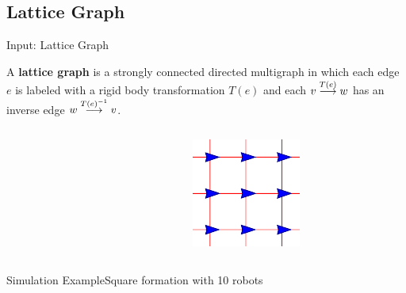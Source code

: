 \subsection{Lattice Graph}
\begin{frame}{Input: Lattice Graph}
  \begin{definition}
    A \textbf{lattice graph} is a strongly connected directed
      multigraph in which each edge $e$ is labeled with a rigid body
      transformation $T(e)$ and each ${v}\overset{T(e)}{\longrightarrow}{w}$ has an
      inverse edge ${w}\overset{T(e)^{-1}}{\longrightarrow}{v}$.  
    \end{definition}
    \begin{columns}[T] %
      \begin{column}{.45\textwidth}
        \begin{figure}
          \centering
        \end{figure}
      \end{column}%
      \begin{column}{.45\textwidth}
        \begin{figure}
          \centering
          \includegraphics[scale=1]{figs/squarelattice}
        \end{figure}
      \end{column}%
    \end{columns}
\end{frame}
\begin{frame}{Simulation Example}{Square formation with 10 robots}
  \begin{center}
  \end{center}
\end{frame}
